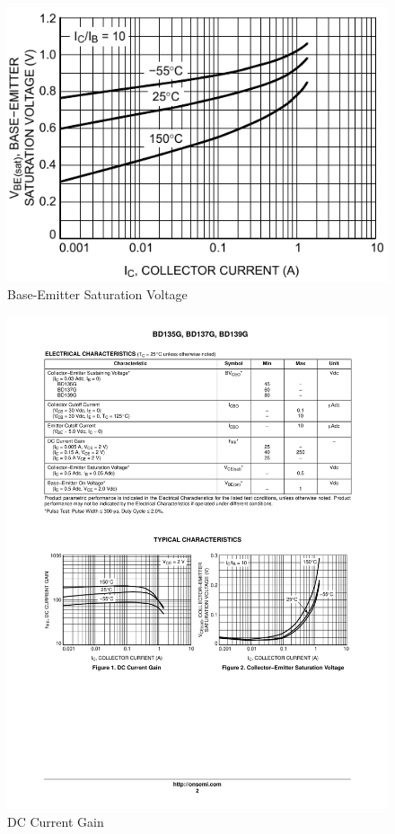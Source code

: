\begin{figure}[H]
    \centering
    \includegraphics[]{Graphics/VHDL/Practice 8/BJT/DATASHEET/VBE-IC.pdf}
    \caption{Base-Emitter Saturation Voltage~\autocite{BD135}}
    \label{fig:VBE_SAT}
\end{figure}

\begin{figure}[H]
    \centering
    \includegraphics[]{Graphics/VHDL/Practice 8/BJT/DATASHEET/BETA-IC.pdf}
    \caption{DC Current Gain~\autocite{BD135}}
    \label{fig:DC_GAIN}
\end{figure}


